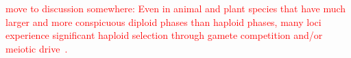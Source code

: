 \documentclass[10pt,letterpaper]{article}
\begin{document}


\textcolor{red}{move to discussion somewhere:
Even in animal and plant species that have much larger and more conspicuous diploid phases than haploid phases, many loci experience significant haploid selection through gamete competition and/or meiotic drive~\cite{Mulcahy:1996ha,JOSEPH:2004haa}. }
\end{document}
